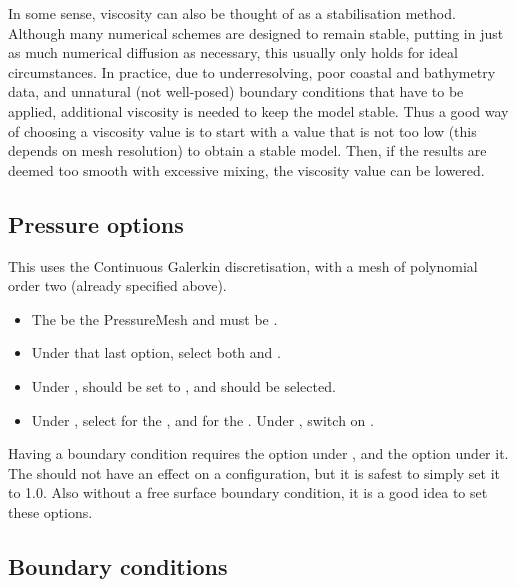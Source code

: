 In some sense, viscosity can also be thought of as a stabilisation method.
Although many numerical schemes are designed to remain stable, putting in just as
much numerical diffusion as necessary, this usually only holds for ideal
circumstances. In practice, due to underresolving, poor coastal and bathymetry
data, and unnatural (not well-posed) boundary conditions that have to be
applied, additional viscosity is needed to keep the model stable. Thus a good
way of choosing a viscosity value is to start with a value that is not too low
(this depends on mesh resolution) to obtain a stable model. Then, if the results
are deemed too smooth with excessive mixing, the viscosity value can be lowered.

\subsection{Pressure options}
This uses the Continuous Galerkin discretisation, with a mesh of polynomial order two (already specified above).

\begin{itemize}
\item The  be the PressureMesh and  must be .
\item Under that last option, select both 
  and .
\item Under ,  should
  be set to , and 
  should be selected.
\item Under , select  for the
  , and  for the .
  Under , switch on
  .
\end{itemize}

Having a boundary condition  requires the option
 under , 
and the option  under it. The 
should not have an effect on a  configuration, but
it is safest to simply set it to 1.0. Also without a free surface boundary
condition, it is a good idea to set these  options.

\subsection{Boundary conditions}

